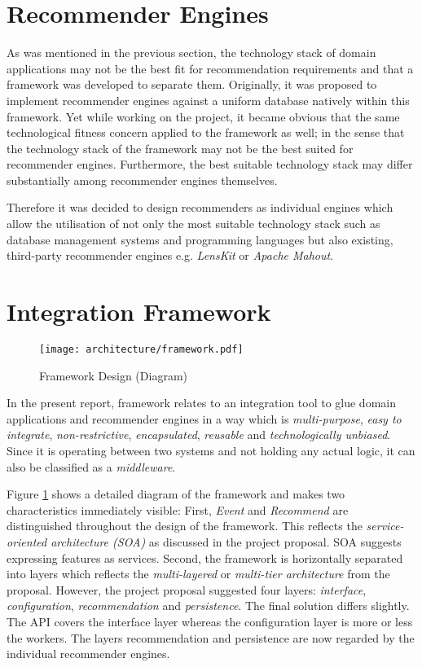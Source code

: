\section{Recommender Engines}
\label{architecture-recommender-engines}

As was mentioned in the previous section, the technology stack of domain applications may not be the best fit for recommendation requirements and that a framework was developed to separate them. Originally, it was proposed to implement recommender engines against a uniform database natively within this framework. Yet while working on the project, it became obvious that the same technological fitness concern applied to the framework as well; in the sense that the technology stack of the framework may not be the best suited for recommender engines. Furthermore, the best suitable technology stack may differ substantially among recommender engines themselves.

Therefore it was decided to design recommenders as individual engines which allow the utilisation of not only the most suitable technology stack such as database management systems and programming languages but also existing, third-party recommender engines e.g. \emph{LensKit} or \emph{Apache Mahout}.

\section{Integration Framework}
\label{architecture-integration-framework}

\begin{figure}[ht]
    \texttt{[image: architecture/framework.pdf]}
    \caption{Framework Design (Diagram)}
    \label{fig:architecture-framework}
\end{figure}

In the present report, framework relates to an integration tool to glue domain applications and recommender engines in a way which is \emph{multi-purpose}, \emph{easy to integrate}, \emph{non-restrictive}, \emph{encapsulated}, \emph{reusable} and \emph{technologically unbiased}. Since it is operating between two systems and not holding any actual logic, it can also be classified as a \emph{middleware}.

Figure \ref{fig:architecture-framework} shows a detailed diagram of the framework and makes two characteristics immediately visible: First, \emph{Event} and \emph{Recommend} are distinguished throughout the design of the framework. This reflects the \emph{service-oriented architecture (SOA)} as discussed in the project proposal. SOA suggests expressing features as services. Second, the framework is horizontally separated into layers which reflects the \emph{multi-layered} or \emph{multi-tier architecture} from the proposal. However, the project proposal suggested four layers: \emph{interface}, \emph{configuration}, \emph{recommendation} and \emph{persistence}. The final solution differs slightly. The API covers the interface layer whereas the configuration layer is more or less the workers. The layers recommendation and persistence are now regarded by the individual recommender engines.

